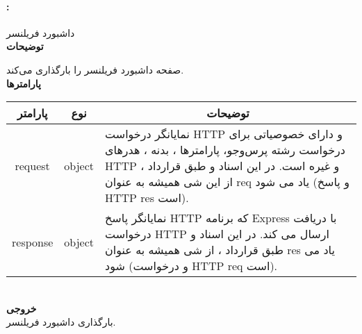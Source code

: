 \paragraph{:}
داشبورد فریلنسر
\\
\textbf{توضیحات}
\hr
\begin{flushleft}
	\framebox[.9\textwidth][l]{
		\lr{
			\textcolor{type}{void}
			\textcolor{func}{getRoot}
			\textcolor{symb}{(}
			\textcolor{type}{object}
			\textcolor{arg}{request}
			\textcolor{symb}{,}
			\textcolor{type}{object}
			\textcolor{arg}{response}
			\textcolor{symb}{);}
		}
	}
\end{flushleft}
صفحه داشبورد فریلنسر را بارگذاری می‌کند.
\\
\textbf{پارامترها}
\hr \\[10pt]
\begin{tabular}{|m{4cm}|m{3cm}|m{10cm}|}
	\hline
	\multicolumn{1}{|c}{پارامتر}
	&
	\multicolumn{1}{|c}{نوع}
	&
	\multicolumn{1}{|c|}{توضیحات}
	\\
	\hline
	\multicolumn{1}{|c}{request}
	&
	\multicolumn{1}{|c|}{object}
	&
	نمایانگر درخواست HTTP و دارای خصوصیاتی برای درخواست رشته پرس‌و‌جو، پارامترها ، بدنه ، هدرهای HTTP و غیره است.
	در این اسناد و طبق قرارداد ، از این شی همیشه به عنوان req یاد می شود (و پاسخ HTTP res است).
	\\
	\hline
	\multicolumn{1}{|c}{response}
	&
	\multicolumn{1}{|c|}{object}
	&
	نمایانگر پاسخ HTTP که برنامه Express با دریافت درخواست HTTP ارسال می کند.
	در این اسناد و طبق قرارداد ، از شی همیشه به عنوان res یاد می شود (و درخواست HTTP req است).
	\\
	\hline
\end{tabular}
\\[10pt]
\textbf{خروجی}
\hr \\
بارگذاری داشبورد فریلنسر.


